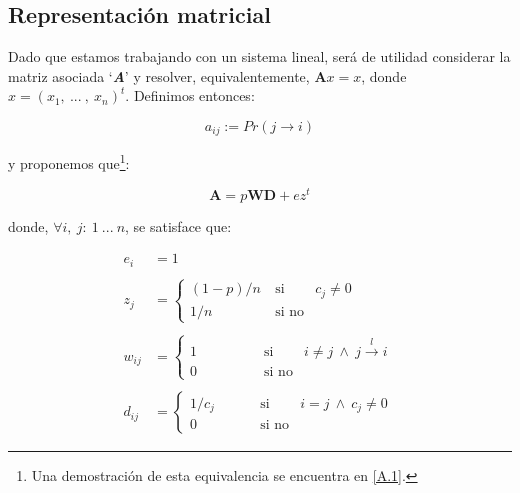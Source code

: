 \vspace{2em}
\subsection{Representación matricial} Dado que estamos trabajando con un sistema lineal, será de utilidad considerar la matriz asociada `\textbf{\textit{A}}' y resolver, equivalentemente, $\textbf{A}x = x$, donde $x = (x_1,\ ...\ ,\ x_n)^t$. Definimos entonces:

\begin{equation}
    a_{ij} := Pr(j \longrightarrow i)
\end{equation}

\vspace{1em}
\noindent y proponemos que\footnote{Una demostración de esta equivalencia se encuentra en \ref{A.1}.}:

\begin{equation}\label{E.1}
    \textbf{A} = p\textbf{W}\textbf{D} + ez^t
\end{equation}

\vspace{1em}
\noindent donde, $\forall i,\ j:\ 1\ ...\ n$, se satisface que:

\begin{align*}
    e_i     &=  1
    \\
    \\
    z_{j}   &=  \left\{ 
                    \begin{array}{lcc}
                    (1 - p) / n     &  \: \text{si}    &  c_j \neq 0 \\
                    1 / n           &  \: \text{si no} &
                    \end{array}
                \right.\
    \\
    \\
    w_{ij}  &=  \left\{ 
                    \begin{array}{lcc}
                    1               &  \qquad \qquad \text{si}    & i \neq j\  \wedge\ j \stackrel{l}{\longrightarrow} i \\
                    0               &  \qquad \qquad \text{si no} &
                    \end{array}
                \right.\
    \\
    \\
    d_{ij}  &=  \left\{ 
                    \begin{array}{lcc}
                    1 / c_j         &  \qquad \: \: \text{si}    & i = j\  \wedge\ c_j \neq 0 \\
                    0               &  \qquad \ \  \text{si no} &
                    \end{array}
                \right.\
\end{align*}
\vspace{1em}

